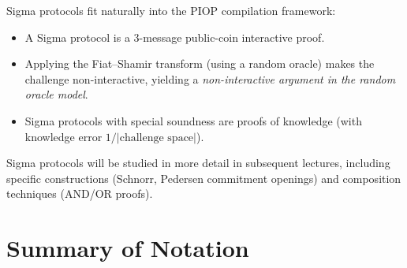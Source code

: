 \documentclass[11pt]{article}
\theoremstyle{plain}
\theoremstyle{definition}
\begin{document}
Sigma protocols fit naturally into the PIOP compilation framework:
\begin{itemize}
  \item A Sigma protocol is a 3-message public-coin interactive proof.
  \item Applying the Fiat--Shamir transform (using a random oracle) makes the challenge
    non-interactive, yielding a \emph{non-interactive argument in the random oracle model}.
  \item Sigma protocols with special soundness are proofs of knowledge (with knowledge
    error $1/|\text{challenge space}|$).
\end{itemize}

Sigma protocols will be studied in more detail in subsequent lectures, including specific
constructions (Schnorr, Pedersen commitment openings) and composition techniques
(AND/OR proofs).

\appendix
\section*{Summary of Notation}
\end{document}
